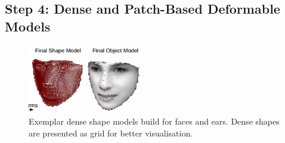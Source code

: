 

{\label{sec:step4}\subsection*{Step 4: Dense and Patch-Based Deformable Models}}


\begin{figure}[b!]
    \centering
    \includegraphics[width=0.45\textwidth]{resources/models}
    \caption{Exemplar dense shape models build for faces and ears. Dense shapes are presented as grid for better visualisation.}
    \label{fig:dense_models}
\end{figure}


